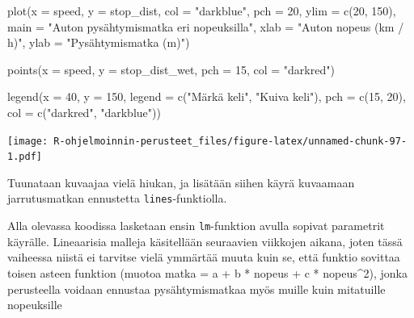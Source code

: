 \documentclass[
]{book}
\newenvironment{Shaded}{\begin{snugshade}}{\end{snugshade}}
\newcommand{\AttributeTok}[1]{\textcolor[rgb]{0.77,0.63,0.00}{#1}}
\newcommand{\DecValTok}[1]{\textcolor[rgb]{0.00,0.00,0.81}{#1}}
\newcommand{\FunctionTok}[1]{\textcolor[rgb]{0.00,0.00,0.00}{#1}}
\newcommand{\NormalTok}[1]{#1}
\newcommand{\StringTok}[1]{\textcolor[rgb]{0.31,0.60,0.02}{#1}}
\begin{document}
\begin{Shaded}
\begin{Highlighting}[]
\FunctionTok{plot}\NormalTok{(}\AttributeTok{x =}\NormalTok{ speed, }\AttributeTok{y =}\NormalTok{ stop\_dist,}
     \AttributeTok{col =} \StringTok{"darkblue"}\NormalTok{, }\AttributeTok{pch =} \DecValTok{20}\NormalTok{,}
     \AttributeTok{ylim =} \FunctionTok{c}\NormalTok{(}\DecValTok{20}\NormalTok{, }\DecValTok{150}\NormalTok{),}
     \AttributeTok{main =} \StringTok{"Auton pysähtymismatka eri nopeuksilla"}\NormalTok{,}
     \AttributeTok{xlab =} \StringTok{"Auton nopeus (km / h)"}\NormalTok{, }\AttributeTok{ylab =} \StringTok{"Pysähtymismatka (m)"}\NormalTok{)}

\FunctionTok{points}\NormalTok{(}\AttributeTok{x =}\NormalTok{ speed, }\AttributeTok{y =}\NormalTok{ stop\_dist\_wet, }\AttributeTok{pch =} \DecValTok{15}\NormalTok{, }\AttributeTok{col =} \StringTok{"darkred"}\NormalTok{)}

\FunctionTok{legend}\NormalTok{(}\AttributeTok{x =} \DecValTok{40}\NormalTok{, }\AttributeTok{y =} \DecValTok{150}\NormalTok{,}
       \AttributeTok{legend =} \FunctionTok{c}\NormalTok{(}\StringTok{"Märkä keli"}\NormalTok{, }\StringTok{"Kuiva keli"}\NormalTok{),}
       \AttributeTok{pch =} \FunctionTok{c}\NormalTok{(}\DecValTok{15}\NormalTok{, }\DecValTok{20}\NormalTok{), }\AttributeTok{col =} \FunctionTok{c}\NormalTok{(}\StringTok{"darkred"}\NormalTok{, }\StringTok{"darkblue"}\NormalTok{))}
\end{Highlighting}
\end{Shaded}

\texttt{[image: R-ohjelmoinnin-perusteet\_files/figure-latex/unnamed-chunk-97-1.pdf]}

Tuunataan kuvaajaa vielä hiukan, ja lisätään siihen käyrä kuvaamaan jarrutusmatkan ennustetta \texttt{lines}-funktiolla.

Alla olevassa koodissa lasketaan ensin \texttt{lm}-funktion avulla sopivat parametrit käyrälle. Lineaarisia malleja käsitellään seuraavien viikkojen aikana, joten tässä vaiheessa niistä ei tarvitse vielä ymmärtää muuta kuin se, että funktio sovittaa toisen asteen funktion (muotoa matka = a + b * nopeus + c * nopeus\^{}2), jonka perusteella voidaan ennustaa pysähtymismatkaa myös muille kuin mitatuille nopeuksille
\end{document}
